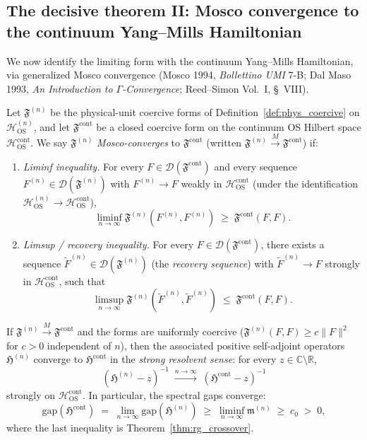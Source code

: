\subsection{The decisive theorem II: Mosco convergence to the
continuum Yang--Mills Hamiltonian}
\label{ssec:mosco}

We now identify the limiting form with the continuum Yang--Mills
Hamiltonian, via generalized Mosco convergence
(Mosco 1994, \emph{Bollettino UMI} 7-B; Dal Maso 1993,
\emph{An Introduction to $\Gamma$-Convergence}; Reed--Simon Vol.~I,
\S~VIII).

\begin{definition}
\label{def:mosco}
Let $\mathfrak{F}^{(n)}$ be the physical-unit coercive forms of
Definition~\ref{def:phys_coercive} on
$\mathcal{H}_{\mathrm{OS}}^{(n)}$, and let
$\mathfrak{F}^{\mathrm{cont}}$ be a closed coercive form on the
continuum OS Hilbert space
$\mathcal{H}_{\mathrm{OS}}^{\mathrm{cont}}$. We say
$\mathfrak{F}^{(n)}$ \emph{Mosco-converges} to
$\mathfrak{F}^{\mathrm{cont}}$ (written
$\mathfrak{F}^{(n)}\xrightarrow{M}\mathfrak{F}^{\mathrm{cont}}$)
if:
\begin{enumerate}
\item[\textbf{(M1)}] \emph{Liminf inequality.} For every
$F\in\mathcal{D}(\mathfrak{F}^{\mathrm{cont}})$ and every sequence
$F^{(n)}\in\mathcal{D}(\mathfrak{F}^{(n)})$ with
$F^{(n)}\to F$ weakly in $\mathcal{H}_{\mathrm{OS}}^{\mathrm{cont}}$
(under the identification
$\mathcal{H}_{\mathrm{OS}}^{(n)}\to
\mathcal{H}_{\mathrm{OS}}^{\mathrm{cont}}$),
\[
  \liminf_{n\to\infty}\mathfrak{F}^{(n)}(F^{(n)},F^{(n)})
  \;\ge\;\mathfrak{F}^{\mathrm{cont}}(F,F).
\]
\item[\textbf{(M2)}] \emph{Limsup / recovery inequality.} For
every $F\in\mathcal{D}(\mathfrak{F}^{\mathrm{cont}})$, there exists
a sequence $\tilde{F}^{(n)}\in\mathcal{D}(\mathfrak{F}^{(n)})$
(the \emph{recovery sequence}) with
$\tilde{F}^{(n)}\to F$ strongly in
$\mathcal{H}_{\mathrm{OS}}^{\mathrm{cont}}$, such that
\[
  \limsup_{n\to\infty}\mathfrak{F}^{(n)}(\tilde{F}^{(n)},
  \tilde{F}^{(n)})
  \;\le\;\mathfrak{F}^{\mathrm{cont}}(F,F).
\]
\end{enumerate}
\end{definition}

\begin{theorem}
\label{thm:mosco_spectral}
If $\mathfrak{F}^{(n)}\xrightarrow{M}\mathfrak{F}^{\mathrm{cont}}$
and the forms are uniformly coercive
($\mathfrak{F}^{(n)}(F,F)\ge c\|F\|^{2}$ for $c>0$ independent of
$n$), then the associated positive self-adjoint operators
$\mathfrak{H}^{(n)}$ converge to
$\mathfrak{H}^{\mathrm{cont}}$ in the \emph{strong resolvent
sense}: for every $z\in\mathbb{C}\setminus\mathbb{R}$,
\[
  (\mathfrak{H}^{(n)}-z)^{-1}
  \;\xrightarrow{n\to\infty}\;
  (\mathfrak{H}^{\mathrm{cont}}-z)^{-1}
\]
strongly on $\mathcal{H}_{\mathrm{OS}}^{\mathrm{cont}}$. In
particular, the spectral gaps converge:
\[
  \mathrm{gap}(\mathfrak{H}^{\mathrm{cont}})
  \;=\;\lim_{n\to\infty}\mathrm{gap}(\mathfrak{H}^{(n)})
  \;\ge\;\liminf_{n\to\infty}\mathfrak{m}^{(n)}
  \;\ge\;c_{0}\;>\;0,
\]
where the last inequality is Theorem~\ref{thm:rg_crossover}.
\end{theorem}

